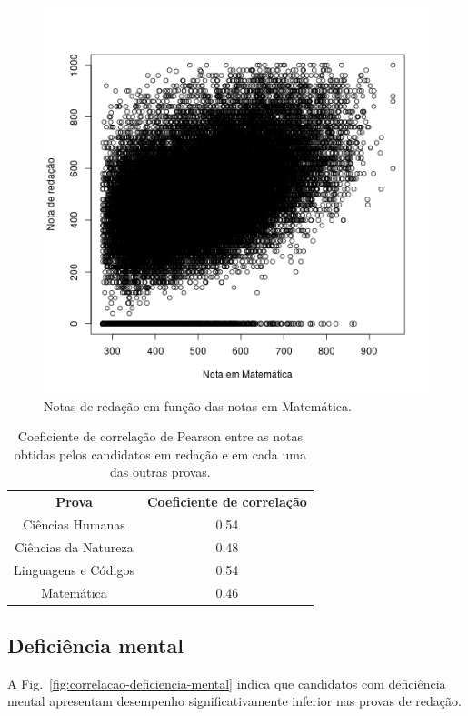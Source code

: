 \documentclass[12pt]{article}
\newcommand{\reffig}[1]{Fig.~\ref{fig:#1}}
\begin{document}
\begin{minipage}{.5\textwidth}
    \begin{figure}[H]
    \centering\includegraphics[width=\linewidth]{../correlacao_nota_mt.png}
    \caption{Notas de redação em função das notas em Matemática.}
    \label{fig:correlacao-nota-mt}
    \end{figure}
\end{minipage}

\begin{table}[H]
\centering\begin{tabular}{ c c }
  \textbf{Prova}       & \textbf{Coeficiente de correlação} \\
  Ciências Humanas     & 0.54 \\
  Ciências da Natureza & 0.48 \\
  Linguagens e Códigos & 0.54 \\
  Matemática           & 0.46 \\
\end{tabular}
\caption{Coeficiente de correlação de Pearson entre as notas obtidas pelos candidatos em redação e em cada uma das outras provas.}
\label{tab:coeficiente-pearson-por-prova}
\end{table}

\subsection{Deficiência mental}
A \reffig{correlacao-deficiencia-mental} indica que candidatos com deficiência mental apresentam desempenho significativamente inferior nas provas de redação.
\end{document}
